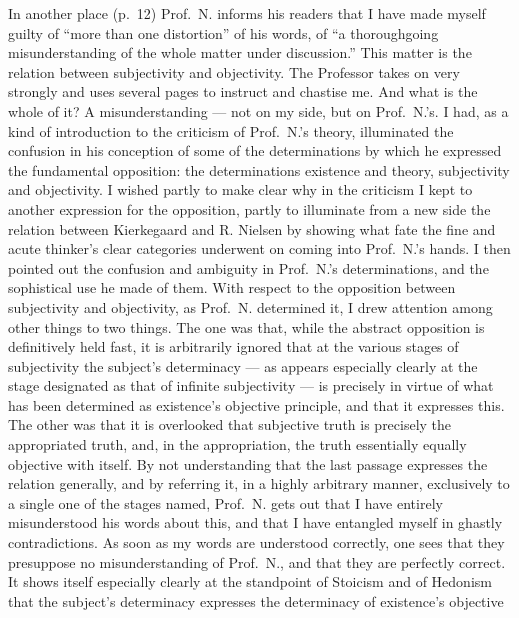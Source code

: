 \documentclass[12pt,a4paper]{book}
\begin{document}
In another place (p.\ 12) Prof.\ N. informs his readers that I have made myself
guilty of ``more than one distortion'' of his words, of ``a thoroughgoing
misunderstanding of the whole matter under discussion.'' This matter is the
relation between subjectivity and objectivity. The Professor takes on very
strongly and uses several pages to instruct and chastise me. And what is the
whole of it? A misunderstanding --- not on my side, but on Prof.\ N.'s. I had,
as a kind of introduction to the criticism of Prof.\ N.'s theory, illuminated
the confusion in his conception of some of the determinations by which he
expressed the fundamental opposition: the determinations existence and theory,
subjectivity and objectivity. I wished partly to make clear why in the criticism
I kept to another expression for the opposition, partly to illuminate from a new
side the relation between Kierkegaard and R. Nielsen by showing what fate the
fine and acute thinker's clear categories underwent on coming into Prof.\ N.'s
hands. I then pointed out the confusion and ambiguity in Prof.\ N.'s
determinations, and the sophistical use he made of them. With respect to the
opposition between subjectivity and objectivity, as Prof.\ N. determined it, I
drew attention among other things to two things. The one
was that, while the abstract opposition is definitively held fast, it is
arbitrarily ignored that at the various stages of subjectivity the subject's
determinacy ---
\setcounter{footnote}{0}
as appears especially clearly at the stage designated as that of infinite
subjectivity --- is precisely in virtue of what has been determined as
existence's objective principle, and that it expresses this. The other was that
it is overlooked that subjective truth is precisely the appropriated truth, and,
in the appropriation, the truth essentially equally objective with itself. By
not understanding that the last passage expresses the relation generally, and
by referring it, in a highly arbitrary manner, exclusively to a single one of
the stages named, Prof.\ N. gets out that I have entirely misunderstood his
words about this, and that I have entangled myself in ghastly contradictions. As
soon as my words are understood correctly, one sees that they presuppose no
misunderstanding of Prof.\ N., and that they are perfectly correct. It shows
itself especially clearly at the standpoint of Stoicism and of Hedonism that the
subject's determinacy expresses the determinacy of existence's objective
\end{document}
